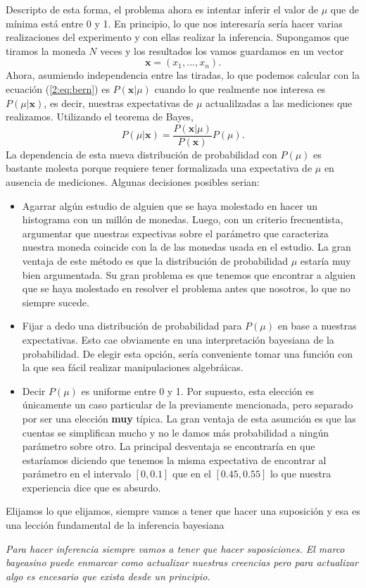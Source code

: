 Descripto de esta forma, el problema ahora es intentar inferir el valor de $\mu$ que de mínima está entre 0 y 1. En principio, lo que nos interesaría sería hacer varias realizaciones del experimento y con ellas realizar la inferencia. Supongamos que tiramos la moneda $N$ veces y los resultados los vamos guardamos en un vector
\begin{equation}
    \mathbf{x} = (x_1,...,x_n).
\end{equation}
Ahora, asumiendo independencia entre las tiradas, lo que podemos calcular con la ecuación (\ref{2:eq:bern}) es $P(\mathbf{x}|\mu)$ cuando lo que realmente nos interesa es $P(\mu|\mathbf{x})$, es decir, nuestras expectativas de $\mu$ actualilzadas a las mediciones que realizamos. Utilizando el teorema de Bayes,
\begin{equation}
    P(\mu|\mathbf{x})
    =
    \frac{P(\mathbf{x}|\mu)}{P(\mathbf{x})}P(\mu).
\end{equation}
La dependencia de esta nueva distribución de probabilidad con $P(\mu)$ es bastante molesta porque requiere tener formalizada una expectativa de $\mu$ en ausencia de mediciones. Algunas decisiones posibles serian:
\begin{itemize}
    \item Agarrar algún estudio de alguien que se haya molestado en hacer un histograma con un millón de monedas. Luego, con un criterio frecuentista, argumentar que nuestras expectivas sobre el parámetro que caracteriza nuestra moneda coincide con la de las monedas usada en el estudio. La gran ventaja de este método es que la distribución de probabilidad $\mu$ estaría muy bien argumentada. Su gran problema es que tenemos que encontrar a alguien que se haya molestado en resolver el problema antes que nosotros, lo que no siempre sucede.
    \item Fijar a dedo una distribución de probabilidad para $P(\mu)$ en base a nuestras expectativas. Esto cae obviamente en una interpretación bayesiana de la probabilidad. De elegir esta opción, sería conveniente tomar una función con la que sea fácil realizar manipulaciones algebráicas.
    \item Decir $P(\mu)$ es uniforme entre 0 y 1. Por supuesto, esta elección es únicamente un caso particular de la previamente mencionada, pero separado por ser una elección {\bf muy} típica. La gran ventaja de esta asumción es que las cuentas se simplifican mucho y no le damos más probabilidad a ningún parámetro sobre otro. La principal desventaja se encontraría en que estaríamos diciendo que tenemos la misma expectativa de encontrar al parámetro en el intervalo $[0,0.1]$ que en el $[0.45,0.55]$ lo que nuestra experiencia dice que es absurdo.
\end{itemize}
Elijamos lo que elijamos, siempre vamos a tener que hacer una suposición y esa es una lección fundamental de la inferencia bayesiana
\begin{center}
    {\it
    Para hacer inferencia siempre vamos a tener que hacer suposiciones. El marco bayeasino puede enmarcar como actualizar nuestras creencias pero para actualizar algo es encesario que exista desde un principio.
    }
\end{center}
